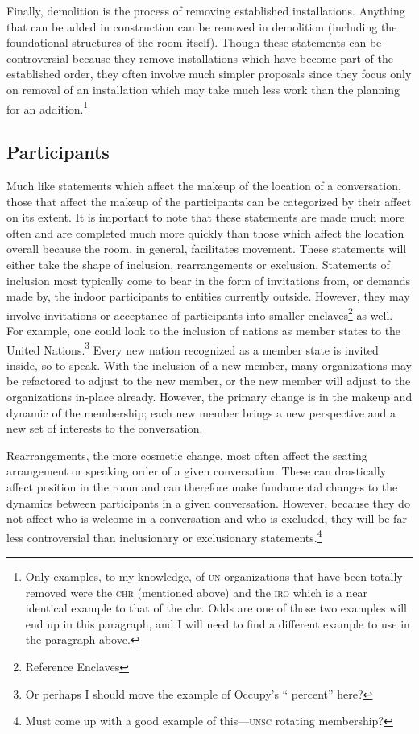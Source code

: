 \documentclass{article}
\begin{document}
Finally, demolition is the process of removing established installations.
Anything that can be added in construction can be removed in demolition (including the foundational structures of the room itself).
Though these statements can be controversial because they remove installations which have become part of the established order, they often involve much simpler proposals since they focus only on removal of an installation which may take much less work than the planning for an addition.\footnote{Only examples, to my knowledge, of \textsc{un} organizations that have been totally removed were the \textsc{chr} (mentioned above) and the \textsc{iro} which is a near identical example to that of the chr. Odds are one of those two examples will end up in this paragraph, and I will need to find a different example to use in the paragraph above.}

\subsection{Participants}
Much like statements which affect the makeup of the location of a conversation, those that affect the makeup of the participants can be categorized by their affect on its extent.
It is important to note that these statements are made much more often and are completed much more quickly than those which affect the location overall because the room, in general, facilitates movement.
These statements will either take the shape of inclusion, rearrangements or exclusion.
Statements of inclusion most typically come to bear in the form of invitations from, or demands made by, the indoor participants to entities currently outside.
However, they may involve invitations or acceptance of participants into smaller enclaves\footnote{Reference Enclaves} as well.
For example, one could look to the inclusion of nations as member states to the United Nations.\footnote{Or perhaps I should move the example of Occupy's `` percent'' here?}
Every new nation recognized as a member state is invited inside, so to speak.
With the inclusion of a new member, many organizations may be refactored to adjust to the new member, or the new member will adjust to the organizations in-place already.
However, the primary change is in the makeup and dynamic of the membership; each new member brings a new perspective and a new set of interests to the conversation.

Rearrangements, the more cosmetic change, most often affect the seating arrangement or speaking order of a given conversation.
These can drastically affect position in the room and can therefore make fundamental changes to the dynamics between participants in a given conversation.
However, because they do not affect who is welcome in a conversation and who is excluded, they will be far less controversial than inclusionary or exclusionary statements.\footnote{Must come up with a good example of this---\textsc{unsc} rotating membership?}
\end{document}
